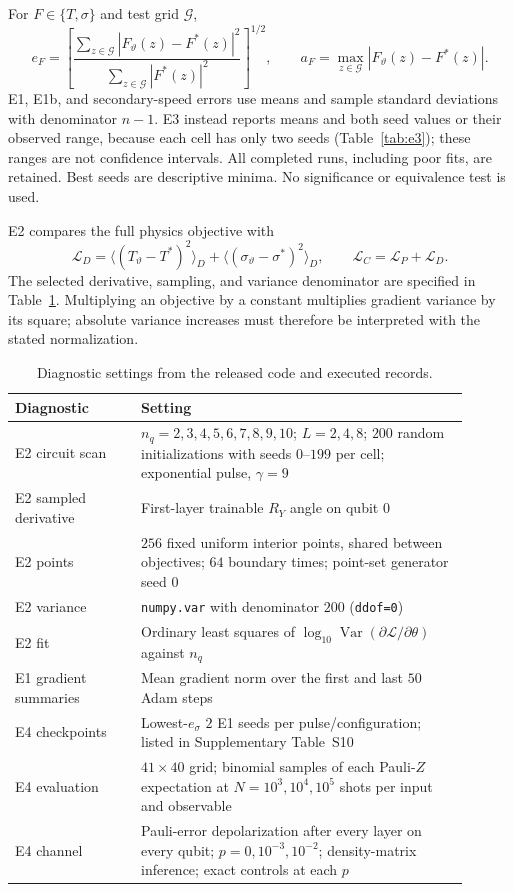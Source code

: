 \documentclass[11pt]{article}
\DeclareMathOperator{\Var}{Var}
\begin{document}
For $F\in\{T,\sigma\}$ and test grid $\mathcal G$,
\begin{equation}
 e_F=\left[\frac{\sum_{z\in\mathcal G}|F_\vartheta(z)-F^*(z)|^2}
 {\sum_{z\in\mathcal G}|F^*(z)|^2}\right]^{1/2},\qquad
 a_F=\max_{z\in\mathcal G}|F_\vartheta(z)-F^*(z)|.
 \label{eq:metrics}
\end{equation}
E1, E1b, and secondary-speed errors use means and sample standard
deviations with denominator $n-1$. E3 instead reports means and both seed
values or their observed range, because each cell has only two seeds
(Table~\ref{tab:e3}); these ranges are not confidence intervals.
All completed runs, including poor fits, are retained. Best seeds are
descriptive minima. No significance or equivalence test is used.

E2 compares the full physics objective with
\begin{equation}
 \mathcal L_D=\langle(T_\vartheta-T^*)^2\rangle_D
 +\langle(\sigma_\vartheta-\sigma^*)^2\rangle_D,\qquad
 \mathcal L_C=\mathcal L_P+\mathcal L_D.
\end{equation}
The selected derivative, sampling, and variance denominator are specified
in Table~\ref{tab:diagnostics}. Multiplying an objective by a constant
multiplies gradient variance by its square; absolute variance increases
must therefore be interpreted with the stated normalization.

\begin{table}[htbp]
\centering
\caption{Diagnostic settings from the released code and executed records.}
\label{tab:diagnostics}
\begin{tabular}{p{0.25\linewidth}p{0.65\linewidth}}
\toprule
Diagnostic & Setting \\
\midrule
E2 circuit scan & $n_q=2,3,4,5,6,7,8,9,10$; $L=2,4,8$;
$200$ random initializations with seeds $0$--$199$ per cell;
exponential pulse, $\gamma=9$ \\
E2 sampled derivative & First-layer trainable $R_Y$ angle on qubit $0$ \\
E2 points & $256$ fixed uniform interior points, shared between objectives;
$64$ boundary times; point-set generator seed $0$ \\
E2 variance & \texttt{numpy.var} with denominator $200$
(\texttt{ddof=0}) \\
E2 fit & Ordinary least squares of $\log_{10}\Var(\partial\mathcal L/
\partial\theta)$ against $n_q$ \\
E1 gradient summaries & Mean gradient norm over the first and last
$50$ Adam steps \\
E4 checkpoints & Lowest-$e_\sigma$ $2$ E1 seeds per pulse/configuration;
listed in Supplementary Table~S10 \\
E4 evaluation & $41\times40$ grid; binomial samples of each Pauli-$Z$
expectation at $N=10^3,10^4,10^5$ shots per input and observable \\
E4 channel & Pauli-error depolarization after every layer on every qubit;
$p=0,10^{-3},10^{-2}$; density-matrix inference; exact controls at each $p$ \\
\bottomrule
\end{tabular}
\end{table}
\end{document}
